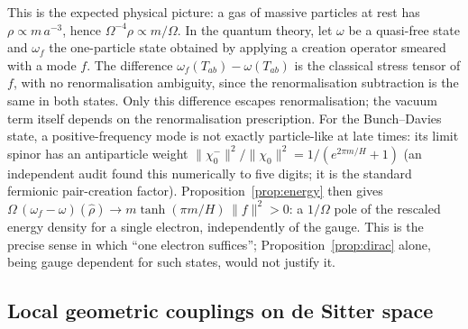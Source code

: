 This is the expected physical picture: a gas of massive particles at rest has $\rho\propto m\,a^{-3}$, hence $\Omega^{-4}\rho\propto m/\Omega$. In the quantum theory, let $\omega$ be a quasi-free state and $\omega_{f}$ the one-particle state obtained by applying a creation operator smeared with a mode $f$. The difference $\omega_{f}(T_{ab})-\omega(T_{ab})$ is the classical stress tensor of $f$, with no renormalisation ambiguity, since the renormalisation subtraction is the same in both states. Only this difference escapes renormalisation; the vacuum term itself depends on the renormalisation prescription. For the Bunch--Davies state, a positive-frequency mode is not exactly particle-like at late times: its limit spinor has an antiparticle weight $\|\chi_{0}^{-}\|^{2}/\|\chi_{0}\|^{2}=1/(e^{2\pi m/H}+1)$ (an independent audit found this numerically to five digits; it is the standard fermionic pair-creation factor). Proposition~\ref{prop:energy} then gives $\Omega\,(\omega_{f}-\omega)(\hat\rho)\to m\tanh(\pi m/H)\,\|f\|^{2}>0$: a $1/\Omega$ pole of the rescaled energy density for a single electron, independently of the gauge. This is the precise sense in which ``one electron suffices''; Proposition~\ref{prop:dirac} alone, being gauge dependent for such states, would not justify it.

\subsection{Local geometric couplings on de Sitter space}
\label{sec:coupling}

